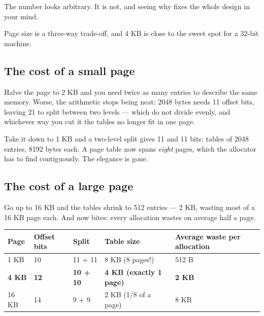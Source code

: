 The number looks arbitrary. It is not, and seeing why fixes the whole design in your mind.

Page size is a three-way trade-off, and 4 KB is close to the sweet spot for a 32-bit machine.

\subsection{The cost of a small page}

Halve the page to 2 KB and you need twice as many entries to describe the same memory. Worse, the
arithmetic stops being neat: 2048 bytes needs 11 offset bits, leaving 21 to split between two levels
--- which do not divide evenly, and whichever way you cut it the tables no longer fit in one page.

Take it down to 1 KB and a two-level split gives 11 and 11 bits: tables of 2048 entries, 8192 bytes
each. A page table now spans \emph{eight} pages, which the allocator has to find contiguously. The
elegance is gone.

\subsection{The cost of a large page}

Go up to 16 KB and the tables shrink to 512 entries --- 2 KB, wasting most of a 16 KB page each. And
now  bites: every allocation wastes on average half a page.

\begin{center}
\begin{tabularx}{\textwidth}{@{}l l l l X@{}}
\toprule
\textbf{Page} & \textbf{Offset bits} & \textbf{Split} & \textbf{Table size} & \textbf{Average waste per allocation} \\
\midrule
1 KB   & 10 & 11 + 11 & 8 KB (8 pages!) & 512 B \\
\textbf{4 KB} & \textbf{12} & \textbf{10 + 10} & \textbf{4 KB (exactly 1 page)} & \textbf{2 KB} \\
16 KB  & 14 & 9 + 9  & 2 KB (1/8 of a page) & 8 KB \\
\bottomrule
\end{tabularx}
\end{center}

